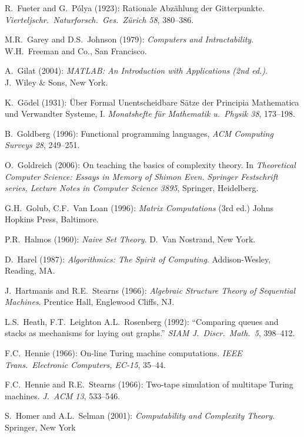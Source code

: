 \begin{thebibliography}{999}
R.~Fueter and G.~P\'{o}lya (1923):
Rationale Abz\"{a}hlung der Gitterpunkte.  {\it
Vierteljschr.~Naturforsch.~Ges.~Z\"{u}rich 58}, 380--386.


M.R.~Garey and D.S.~Johnson (1979):
{\it Computers and Intractability}.
W.H.~Freeman and Co., San Francisco.

A.~Gilat (2004):
{\it MATLAB: An Introduction with Applications (2nd ed.)}.
J.~Wiley \& Sons, New York.

K.~G\"{o}del (1931): \"{U}ber Formal Unentscheidbare S\"{a}tze der
Principia Mathematica und Verwandter Systeme, I.  {\it Monatshefte
f\"{u}r Mathematik u.~Physik 38}, 173--198.

B.~Goldberg (1996): Functional programming languages,  {\it ACM
  Computing Surveys 28}, 249--251.

O.~Goldreich (2006): On teaching the basics of complexity theory.  In
{\it Theoretical Computer Science: Essays in Memory of Shimon Even.}
{\it Springer Festschrift series, Lecture Notes in Computer Science
3895}, Springer, Heidelberg.

G.H.~Golub, C.F.~Van Loan (1996):
{\it Matrix Computations} (3rd ed.)
Johns Hopkins Press,  Baltimore.


P.R.~Halmos (1960):
{\it Naive Set Theory}.
D.~Van Nostrand, New York.

D.~Harel (1987): {\it Algorithmics: The Spirit of Computing}.
Addison-Wesley, Reading, MA.

J.~Hartmanis and R.E.~Stearns (1966): {\it Algebraic Structure Theory
of Sequential Machines}.  Prentice Hall, Englewood Cliffs, NJ.

L.S.~Heath, F.T.~Leighton A.L.~Rosenberg (1992): ``Comparing queues
and stacks as mechanisms for laying out graphs.''  {\it SIAM
  J.~Discr.~Math.~5}, 398--412.

F.C.~Hennie (1966): On-line Turing machine computations.  {\it IEEE
Trans.~Electronic Computers, EC-15}, 35--44.

F.C.~Hennie and R.E.~Stearns (1966): Two-tape simulation of multitape
Turing machines. {\it J.~ACM 13}, 533--546.

S.~Homer and A.L.~Selman (2001):
{\it Computability and Complexity Theory}.
Springer, New York


\end{thebibliography}
